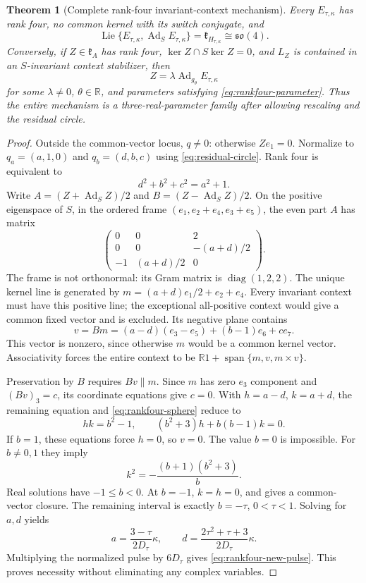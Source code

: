 \documentclass[11pt,a4paper]{article}
\newtheorem{theorem}{Theorem}[section]
\newcommand{\RR}{\mathbb R}
\newcommand{\Lie}{\operatorname{Lie}}
\newcommand{\Ad}{\operatorname{Ad}}
\newcommand{\Span}{\operatorname{span}}
\begin{document}
\begin{theorem}[Complete rank-four invariant-context mechanism]
\label{thm:rankfour-context-complete}
Every $E_{\tau,\kappa}$ has rank four, no common kernel with its switch conjugate, and
\[
 \Lie\{E_{\tau,\kappa},\Ad_SE_{\tau,\kappa}\}
 =\mathfrak k_{H_{\tau,\kappa}}\cong\mathfrak{so}(4).
\]
Conversely, if $Z\in\mathfrak k_A$ has rank four, $\ker Z\cap S\ker Z=0$, and $L_Z$ is contained in an $S$-invariant context stabilizer, then
\[
 Z=\lambda\Ad_{g_\theta}E_{\tau,\kappa}
\]
for some $\lambda\ne0$, $\theta\in\RR$, and parameters satisfying \eqref{eq:rankfour-parameter}.  Thus the entire mechanism is a three-real-parameter family after allowing rescaling and the residual circle.
\end{theorem}
\begin{proof}
Outside the common-vector locus, $q\ne0$: otherwise $Ze_1=0$.  Normalize to $q_a=(a,1,0)$ and $q_b=(d,b,c)$ using \eqref{eq:residual-circle}.  Rank four is equivalent to
\begin{equation}
 d^2+b^2+c^2=a^2+1.
 \label{eq:rankfour-sphere}
\end{equation}
Write $A=(Z+\Ad_SZ)/2$ and $B=(Z-\Ad_SZ)/2$.  On the positive eigenspace of $S$, in the ordered frame $(e_1,e_2+e_4,e_3+e_5)$, the even part $A$ has matrix
\[
 \begin{pmatrix}0&0&2\\0&0&-(a+d)/2\\-1&(a+d)/2&0\end{pmatrix}.
\]
The frame is not orthonormal: its Gram matrix is $\operatorname{diag}(1,2,2)$.  The unique kernel line is generated by $m=(a+d)e_1/2+e_2+e_4$.  Every invariant context must have this positive line; the exceptional all-positive context would give a common fixed vector and is excluded.  Its negative plane contains
\[
 v=Bm=(a-d)(e_3-e_5)+(b-1)e_6+ce_7.
\]
This vector is nonzero, since otherwise $m$ would be a common kernel vector.  Associativity forces the entire context to be $\RR1+\Span\{m,v,m\times v\}$.

Preservation by $B$ requires $Bv\parallel m$.  Since $m$ has zero $e_3$ component and $(Bv)_3=c$, its coordinate equations give $c=0$.  With $h=a-d$, $k=a+d$, the remaining equation and \eqref{eq:rankfour-sphere} reduce to
\[
hk=b^2-1,\qquad (b^2+3)h+b(b-1)k=0.
\]
If $b=1$, these equations force $h=0$, so $v=0$.  The value $b=0$ is impossible.  For $b\ne0,1$ they imply
\[
 k^2=-\frac{(b+1)(b^2+3)}b.
\]
Real solutions have $-1\le b<0$.  At $b=-1$, $k=h=0$, and  gives a common-vector closure.  The remaining interval is exactly $b=-\tau$, $0<\tau<1$.  Solving for $a,d$ yields
\[
 a=\frac{3-\tau}{2D_\tau}\kappa,\qquad
 d=\frac{2\tau^2+\tau+3}{2D_\tau}\kappa.
\]
Multiplying the normalized pulse by $6D_\tau$ gives \eqref{eq:rankfour-new-pulse}.  This proves necessity without eliminating any complex variables.


\end{proof}
\end{document}
